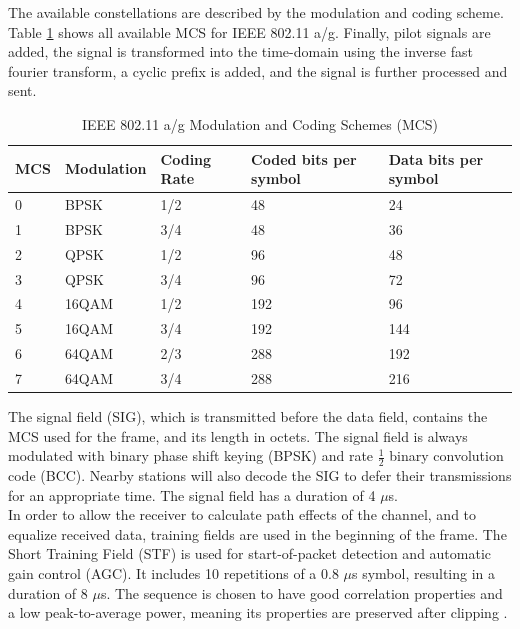 The available constellations are described by the modulation and coding scheme. Table \ref{tbl:mcs} shows all available MCS for IEEE 802.11 a/g. Finally, pilot signals are added, the signal is transformed into the time-domain using the inverse fast fourier transform, a cyclic prefix is added, and the signal is further processed and sent.

\begin{table}[ht]
	\begin{center}
		\begin{tabular}{|p{2.5cm}|p{2.5cm}|p{2.5cm}|p{2.5cm}|p{2.5cm}|}
			\hline
			\textbf{MCS} & \textbf{Modulation} & \textbf{Coding Rate} & \textbf{Coded bits per symbol} & \textbf{Data bits per symbol} \\ \hline
			0 & BPSK & 1/2 & 48 & 24 \\ \hline
			1 & BPSK & 3/4 & 48 & 36 \\ \hline
			2 & QPSK & 1/2 & 96 & 48 \\ \hline
			3 & QPSK & 3/4 & 96 & 72 \\ \hline
			4 & 16QAM & 1/2 & 192 & 96 \\ \hline
			5 & 16QAM & 3/4 & 192 & 144 \\ \hline
			6 & 64QAM & 2/3 & 288 & 192 \\ \hline
			7 & 64QAM & 3/4 & 288 & 216 \\ \hline
		\end{tabular}
	\end{center}
	\caption[IEEE 802.11 a/g Modulation and Coding Schemes]{IEEE 802.11 a/g Modulation and Coding Schemes (MCS) \cite{NEEDED}}
	\label{tbl:mcs}
\end{table}

The signal field (SIG), which is transmitted before the data field, contains the MCS used for the frame, and its length in octets. The signal field is always modulated with binary phase shift keying (BPSK) and rate $\frac{1}{2}$ binary convolution code (BCC). Nearby stations will also decode the SIG to defer their transmissions for an appropriate time. The signal field has a duration of 4 $\mu$s.\\

In order to allow the receiver to calculate path effects of the channel, and to equalize received data, training fields are used in the beginning of the frame. The Short Training Field (STF) is used for start-of-packet detection and automatic gain control (AGC). It includes 10 repetitions of a 0.8 $\mu$s symbol, resulting in a duration of 8 $\mu$s. The sequence is chosen to have good correlation properties and a low peak-to-average power, meaning its properties are preserved after clipping \cite{perahia2013}.

